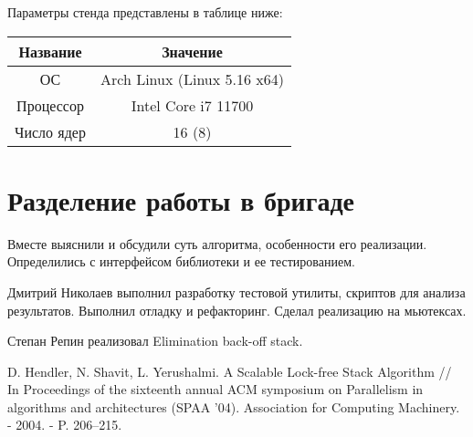 \documentclass[a4paper,14pt]{extarticle}
\begin{document}
Параметры стенда представлены в таблице ниже:

\begin{table}[H]
\centering
\begin{tabular}{|c|c|}
    \hline
    Название & Значение \\
    \hline
    ОС & Arch Linux (Linux 5.16 x64) \\
    \hline
    Процессор & Intel Core i7 11700 \\
    \hline
    Число ядер & 16 (8) \\
    \hline
\end{tabular}
\end{table}


\section{Разделение работы в бригаде}

Вместе выяснили и обсудили суть алгоритма, особенности его реализации.
Определились с интерфейсом библиотеки и ее тестированием.

Дмитрий Николаев выполнил разработку тестовой утилиты, скриптов для анализа
результатов. Выполнил отладку и рефакторинг. Сделал реализацию на мьютексах.

Степан Репин реализовал Elimination back-off stack.

\begingroup
\renewcommand{\section}[2]{\anonsection{Список использованных источников}}
\begin{thebibliography}{00}

    D. Hendler, N. Shavit, L. Yerushalmi. A Scalable Lock-free Stack Algorithm
    // In Proceedings of the sixteenth annual ACM symposium on Parallelism in
    algorithms and architectures (SPAA '04). Association for Computing
    Machinery. - 2004. - P. 206–215.

\end{thebibliography}
\endgroup
\end{document}
